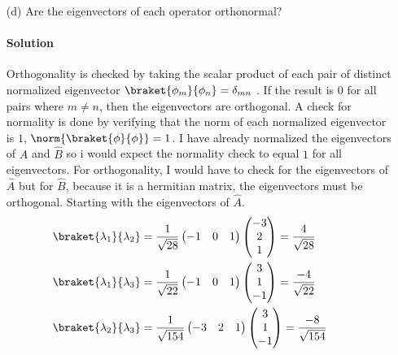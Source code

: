 \documentclass{article}
\begin{document}
\begin{enumerate}
\clearpage
		
		\item[(d)] Are the eigenvectors of each operator orthonormal? 
		\paragraph{Solution} Orthogonality is checked by taking the scalar product of each pair of distinct normalized eigenvector $\braket{\phi_m}{\phi_n} = \delta_{mn}$ . If the result is $0$ for all pairs where $m \neq n$, then the eigenvectors are orthogonal. A check for normality is done by verifying that the norm of each normalized eigenvector is $1$, $\norm{\braket{\phi}{\phi}} = 1$. I have already normalized the eigenvectors of $\hat{A}$ and $\hat{B}$ so i would expect the normality check to equal $1$ for all eigenvectors. For orthogonality, I would have to check for the eigenvectors of $\hat{A}$ but for $\hat{B}$, because it is a hermitian matrix, the eigenvectors must be orthogonal. Starting with the eigenvectors of $\hat{A}$.
		\begin{equation*}
			\begin{split}
				\braket{\lambda_1}{\lambda_2} &= \frac{1}{\sqrt{28}}
				\begin{pmatrix} -1 & 0 & 1 \end{pmatrix}
				\begin{pmatrix} -3 \\ 2 \\ 1 \end{pmatrix}
				= \frac{4}{\sqrt{28}} \\
				\braket{\lambda_1}{\lambda_3} &= \frac{1}{\sqrt{22}}
				\begin{pmatrix} -1 & 0 & 1 \end{pmatrix}
				\begin{pmatrix} 3 \\ 1 \\ -1 \end{pmatrix}
				= \frac{-4}{\sqrt{22}} \\
				\braket{\lambda_2}{\lambda_3} &= \frac{1}{\sqrt{154}}
				\begin{pmatrix} -3 & 2 & 1 \end{pmatrix}
				\begin{pmatrix} 3 \\ 1 \\ -1 \end{pmatrix}
				= \frac{-8}{\sqrt{154}}
			\end{split}
			\qquad
			\begin{split}

\end{split}
\end{equation*}
\end{enumerate}
\end{document}
